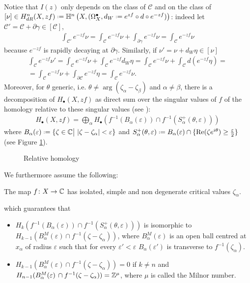 \documentclass[11pt,a4paper,twoside,leqno,noamsfonts]{amsart}
\numberwithin{equation}{section}
\begin{document}
Notice that $I(z)$ only depends on the class of $\mathcal{C}$ and on the class of $[\nu]\in H_{dR}^n(X,zf)\defeq\mathbb{H}^n\left(X,(\Omega^\bullet_X,d_W\defeq e^{zf}\circ d\circ e^{-zf})\right)$: indeed let $\mathcal{C}'=\mathcal{C}+\partial\gamma\in [\mathcal{C}]$,
\begin{align*}
\int_{\mathcal{C}'}e^{-zf}\nu=\int_{\mathcal{C}}e^{-zf}\nu+\int_{\partial\gamma}e^{-zf}\nu=\int_{\mathcal{C}}e^{-zf}\nu
\end{align*} 
because $e^{-zf}$ is rapidly decaying at $\partial\gamma$. Similarly, if $\nu'=\nu+d_W\eta\in [\nu]$
\begin{multline*}
\int_{\mathcal{C}}e^{-zf}\nu'=\int_{\mathcal{C}}e^{-zf}\nu+\int_{\mathcal{C}}e^{-zf}d_{W}\eta=\int_{\mathcal{C}}e^{-zf}\nu+\int_{\mathcal{C}}d(e^{-zf}\eta)=\\
=\int_{\mathcal{C}}e^{-zf}\nu+\int_{\partial\mathcal{C}}e^{-zf}\eta=\int_{\mathcal{C}}e^{-zf}\nu.
\end{multline*}
Moreover, for $\theta$ generic, i.e. $\theta\neq\arg(\zeta_\alpha-\zeta_\beta)$ and $\alpha\neq\beta$, there is a decomposition of $H_\bullet(X,zf)$ as direct sum over the singular values of $f$ of the homology relative to these singular values (see \cite{pham}\cite{KKP}): 
\begin{align}\label{decomposition H_B}
H_\bullet(X,zf)=\bigoplus_{\alpha}H_\bullet\left(f^{-1}(B_\alpha(\varepsilon))\cap f^{-1}(S_\alpha^+(\theta,\varepsilon))\right)
\end{align}     
where $B_\alpha(\varepsilon)\defeq\lbrace \zeta \in\C\big\vert\,\, |\zeta-\zeta_\alpha|<\varepsilon\rbrace$ and $S_\alpha^+(\theta,\varepsilon)\defeq B_\alpha(\varepsilon)\cap\lbrace \mathrm{Re}(\zeta e^{i\theta})\geq \tfrac{\varepsilon}{2}\rbrace$ (see Figure \ref{fig:relative_homology}).
\begin{figure}
\caption{Relative homology}\label{fig:relative_homology}
\end{figure}
We furthermore assume the following:
\begin{assumption}\label{assumption_on_f}
The map $f\colon X\to\mathbb C$ has isolated, simple and non degenerate critical values $\zeta_\alpha$. 
\end{assumption}

which guarantees that 
\begin{itemize}
\item $H_k\left(f^{-1}(B_\alpha(\varepsilon))\cap f^{-1}(S_\alpha^+(\theta,\varepsilon))\right)$ is isomorphic to $H_{k-1}(B_\alpha^M(\varepsilon)\cap f^{-1}(\zeta-\zeta_\alpha))$, where $B_\alpha
^M(\varepsilon)$ is an open ball centred at $x_\alpha$ of radius $\varepsilon$ such that for every $\varepsilon'<\varepsilon$ $B_\alpha(\varepsilon')$ is transverse to $f^{-1}(\zeta_\alpha)$. 
\item $H_{k-1}(B_\alpha^M(\varepsilon)\cap f^{-1}(\zeta-\zeta_\alpha))=0$ if $k\neq n$ and $H_{n-1}(B_\alpha^M(\varepsilon)\,\cap f^{-1}(\zeta-\zeta_\alpha))=\mathbb Z^\mu$, where $\mu$ is called the Milnor number.   
\end{itemize}
\end{document}
